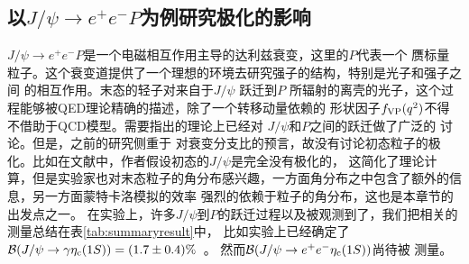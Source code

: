 \subsection{以$J/\psi \to e^+ e^- P$为例研究极化的影响}
$J/\psi \to e^+ e^- P$是一个电磁相互作用主导的达利兹衰变，这里的$P$代表一个
赝标量粒子。这个衰变道提供了一个理想的环境去研究强子的结构，特别是光子和强子之间
的相互作用\cite{Landsberg:1986sk, Landsberg:1986fd}。末态的轻子对来自于$J/\psi$ 跃迁到$P$
所辐射的离壳的光子，这个过程能够被QED理论精确的描述\cite{Kroll:1955zu}，除了一个转移动量依赖的
形状因子$f_{\rm VP}(q^{2})$不得不借助于QCD模型\cite{Achasov:1992ku, Klingl:1996by, Faessler:1999de,
Terschluesen:2010ik, Ivashyn:2011hb}。需要指出的理论上已经对 $J/\psi$和$P$之间的跃迁做了广泛的
讨论\cite{Shifman:1979nx, Khodjamirian:1983gd, Beilin:1985da, Zhang:1991et, Ebert:2002pp, Lahde:2002wj, 
Hwang:2006cua,  Dudek:2006ej, Ke:2010pp, Donald:2012ga, Becirevic:2012dc,Pineda:2013lta}。但是，之前的研究侧重于
对衰变分支比的预言，故没有讨论初态粒子的极化。比如在文献\cite{Fu:2011yy}中，作者假设初态的$J/\psi$是完全没有极化的，
这简化了理论计算，但是实验家也对末态粒子的角分布感兴趣，一方面角分布之中包含了额外的信息，另一方面蒙特卡洛模拟的效率
强烈的依赖于粒子的角分布，这也是本章节的出发点之一。
 在实验上，许多$J/\psi$到$P$的跃迁过程以及被观测到了，我们把相关的测量总结在表\ref{tab:summaryresult}中，
比如实验上已经确定了
${\cal B}(J/\psi \to \gamma\eta_{\rm c}(1S)) = (1.7 \pm 0.4) \%$~\cite{Tanabashi:2018oca}。
 然而${\cal B}(J/\psi \to e^{+} e^{-} \eta_{\rm c}(1S))$尚待被
测量。
